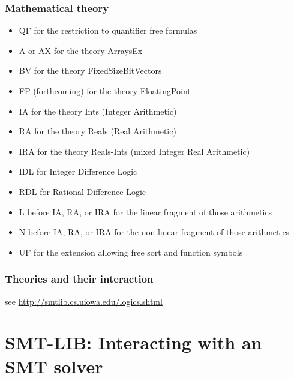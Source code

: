 \documentclass{beamer}
\begin{document}
\begin{frame}[fragile]\frametitle{Mathematical theory}

  \begin{itemize}
  \item QF for the restriction to quantifier free formulas
  \item  A or AX for the theory ArraysEx
  \item     BV for the theory FixedSizeBitVectors
  \item     FP (forthcoming) for the theory FloatingPoint
  \item     IA for the theory Ints (Integer Arithmetic)
  \item     RA for the theory Reals (Real Arithmetic)
  \item     IRA for the theory Reals-Ints (mixed Integer Real Arithmetic)
  \item     IDL for Integer Difference Logic
  \item     RDL for Rational Difference Logic
  \item     L before IA, RA, or IRA for the linear fragment of those
    arithmetics
  \item     N before IA, RA, or IRA for the non-linear fragment of those
    arithmetics
  \item     UF for the extension allowing free sort and function symbols
  \end{itemize}
  
\end{frame}

\begin{frame}[fragile]\frametitle{Theories and their interaction}
  see \url{http://smtlib.cs.uiowa.edu/logics.shtml}


\end{frame}




\section{SMT-LIB: Interacting with an SMT solver}
\end{document}
